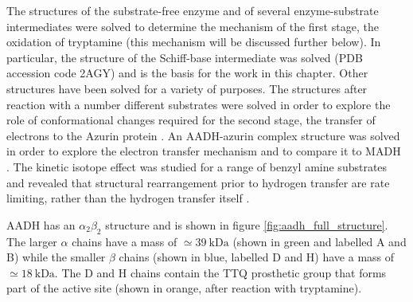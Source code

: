 The structures of the substrate-free enzyme and of several enzyme-substrate intermediates were solved to determine the mechanism of the first stage, the oxidation of tryptamine \cite{masgrauAtomicDescriptionEnzyme2006} (this mechanism will be discussed further below). In particular, the structure of the Schiff-base intermediate was solved (PDB accession code 2AGY) and is the basis for the work in this chapter. Other structures have been solved for a variety of purposes. The structures after reaction with a number different substrates were solved in order to explore the role of conformational changes required for the second stage, the transfer of electrons to the Azurin protein \cite{roujeinikovaNewInsightsReductive2007}.  An AADH-azurin complex structure was solved in order to explore the electron transfer mechanism and to compare it to MADH \cite{sukumarCrystalStructureElectron2006}. The kinetic isotope effect was studied for a range of benzyl amine substrates and revealed that structural rearrangement prior to hydrogen transfer are rate limiting, rather than the hydrogen transfer itself \cite{hothiIsotopeEffectsReveal2007}.  

AADH has an $\alpha_{2}\beta_{2}$ structure and is shown in figure \ref{fig:aadh_full_structure}. The larger $\alpha$ chains have a mass of $\simeq \SI{39}{\kilo\dalton}$ (shown in green and labelled A and B) while the smaller $\beta$ chains (shown in blue, labelled D and H) have a mass of $\simeq \SI{18}{\kilo\dalton}$. The D and H chains contain the TTQ prosthetic group that forms part of the active site (shown in orange, after reaction with tryptamine). 

